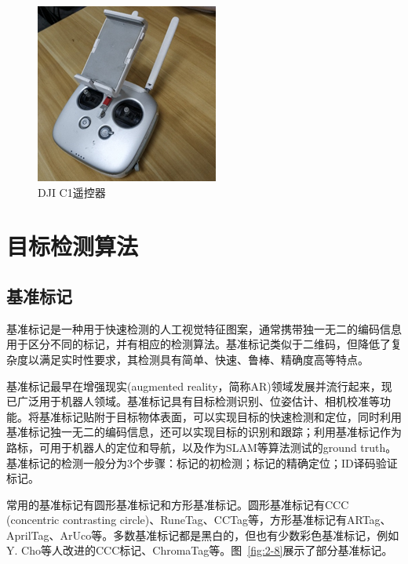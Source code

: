 \clearpage
\begin{figure}[htb]
	\centering
	\includegraphics[width=0.4\linewidth]{figures/2-7.png}
	\caption{DJI C1遥控器}
	\label{fig:2-7}
\end{figure}

\section{目标检测算法}
\subsection{基准标记}
基准标记是一种用于快速检测的人工视觉特征图案，通常携带独一无二的编码信息用于区分不同的标记，并有相应的检测算法。基准标记类似于二维码，但降低了复杂度以满足实时性要求，其检测具有简单、快速、鲁棒、精确度高等特点。

基准标记最早在增强现实(augmented reality，简称AR)领域发展并流行起来，现已广泛用于机器人领域。基准标记具有目标检测识别、位姿估计、相机校准等功能。将基准标记贴附于目标物体表面，可以实现目标的快速检测和定位，同时利用基准标记独一无二的编码信息，还可以实现目标的识别和跟踪；利用基准标记作为路标，可用于机器人的定位和导航，以及作为SLAM等算法测试的ground truth。基准标记的检测一般分为3个步骤：标记的初检测；标记的精确定位；ID译码验证标记。

常用的基准标记有圆形基准标记和方形基准标记。圆形基准标记有CCC (concentric contrasting circle)、RuneTag、CCTag等，方形基准标记有ARTag、AprilTag、ArUco等。多数基准标记都是黑白的，但也有少数彩色基准标记，例如Y. Cho等人改进的CCC标记、ChromaTag等。图~\ref{fig:2-8}展示了部分基准标记。


